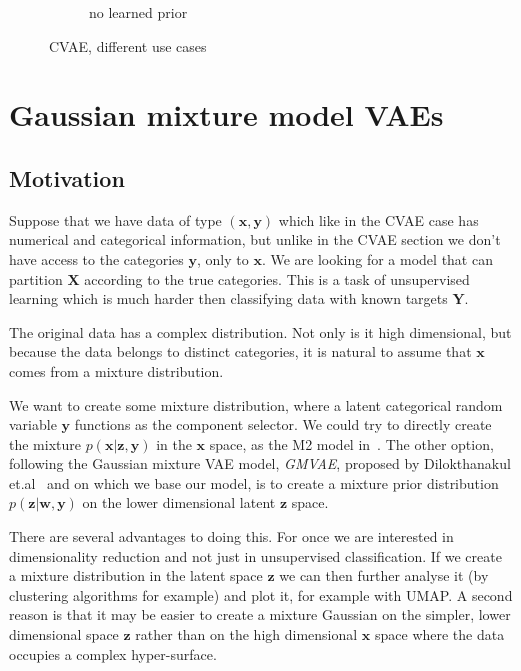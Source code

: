 \documentclass[11pt, a4paper]{report}
\theoremstyle{plain}
\theoremstyle{definition}
\theoremstyle{remark}
\newcommand{\X}{\mathbf{X}}
\newcommand{\x}{\mathbf{x}}
\newcommand{\z}{\mathbf{z}}
\newcommand{\Y}{\mathbf{Y}}
\newcommand{\y}{\mathbf{y}}
\newcommand{\w}{\mathbf{w}}
\begin{document}
\begin{figure}[h]
\begin{subfigure}[b]{0.33\textwidth}
\caption{no learned prior}
\end{subfigure}
\caption{CVAE, different use cases}
\label{fig:cvaeumap}
\end{figure}

\chapter{Gaussian mixture model VAEs}
\section{Motivation}

Suppose that we have data of type $(\x,\y)$ which like in the CVAE case has numerical and 
categorical information, but unlike in the CVAE section we don't have access to
the categories $\y$, only to $\x$. 
We are looking for a model that can partition
$\X$ according to the true categories.
This is a task of unsupervised learning which is much harder then classifying
data with known targets $\Y$.

The original data has a complex distribution. Not only is it high dimensional,
but because the data belongs to distinct categories, it is natural to assume
that $\x$ comes from a mixture distribution.

We want to create some mixture distribution, where a latent categorical random
variable $\y$ functions as the component selector. We could try to directly
create the mixture $p(\x | \z, \y)$ in the $\x$ space, as the M2 model
in~\cite{kingma2014semi}.
The other option, following the Gaussian mixture VAE model, \emph{GMVAE}, proposed by
Dilokthanakul et.al~\cite{dilokthanakul2016deep} and on which we base our model,
is to create a mixture prior distribution $p(\z | \w, \y)$ on the lower
dimensional latent $\z$ space.

There are several advantages to doing this. For once we are interested in
dimensionality reduction and not just in unsupervised classification. If we
create a mixture distribution in the latent space $\z$ we can then further
analyse it (by clustering algorithms for example) and plot it, for example with
UMAP. A second reason is that it may be easier to create a mixture Gaussian on
the simpler, lower dimensional space $\z$ rather than on the high dimensional
$\x$ space where the data occupies a complex hyper-surface.

%
\end{document}
